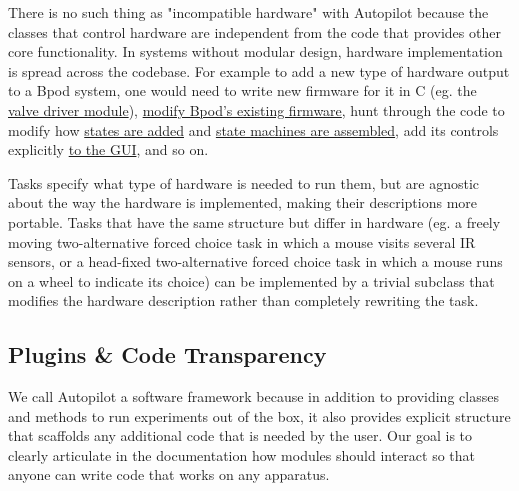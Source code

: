 There is no such thing as "incompatible hardware" with Autopilot because the classes that control hardware are independent from the code that provides other core functionality. In systems without modular design, hardware implementation is spread across the codebase. For example to add a new type of hardware output to a Bpod system, one would need to write new firmware for it in C (eg. the \href{https://github.com/sanworks/Bpod\_ValveDriver\_Firmware}{valve driver module}), \href{https://github.com/sanworks/Bpod_StateMachine_Firmware/blob/v22/Preconfigured/StateMachine-Bpod2_0/StateMachine-Bpod2_0.ino}{modify Bpod's existing firmware}, hunt through the code to modify how \href{https://github.com/sanworks/Bpod_Gen2/blob/71f3a256b68926b65eae71e10fd747bd28e7ba7d/Functions/State\%20Machine\%20Assembler/AddState.m#L170}{states are added} and \href{https://github.com/sanworks/Bpod_Gen2/blob/71f3a256b68926b65eae71e10fd747bd28e7ba7d/Functions/\%40BpodObject/SetupStateMachine.m#L123}{state machines are assembled}, add its controls explicitly \href{https://github.com/sanworks/Bpod_Gen2/blob/71f3a256b68926b65eae71e10fd747bd28e7ba7d/Functions/Override\%20Panels/StateMachinePanel_2_0_0.m}{to the GUI}, and so on. 

Tasks specify what type of hardware is needed to run them, but are agnostic about the way the hardware is implemented, making their descriptions more portable. Tasks that have the same structure but differ in hardware (eg. a freely moving two-alternative forced choice task in which a mouse visits several IR sensors, or a head-fixed two-alternative forced choice task in which a mouse runs on a wheel to indicate its choice) can be implemented by a trivial subclass that modifies  the hardware description rather than completely rewriting the task.

\subsection{Plugins \& Code Transparency}
\label{sec:expansion}

We call Autopilot a software framework because in addition to providing classes and methods to run experiments out of the box, it also provides explicit structure that scaffolds any additional code that is needed by the user. Our goal is to clearly articulate in the documentation how modules should interact so that anyone can write code that works on any apparatus. 

